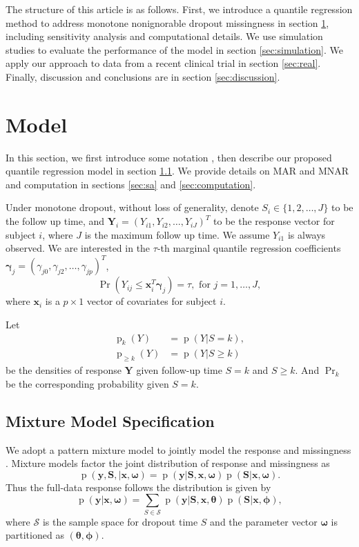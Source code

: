\documentclass[12pt]{article}
\DeclareMathOperator{\pr}{p}
\DeclareMathOperator{\prob}{Pr}
\begin{document}
The structure of this article is as follows. First, we introduce a
quantile regression method to address monotone nonignorable dropout
missingness in section \ref{sec:model}, including sensitivity analysis
and computational details.  We use simulation studies to evaluate the
performance of the model in section \ref{sec:simulation}. We apply our
approach to data from a recent clinical trial in section
\ref{sec:real}. Finally, discussion and conclusions are in section
\ref{sec:discussion}.

\section{Model}
\label{sec:model}

In this section, we first introduce some notation
, then describe our proposed quantile regression model in
section \ref{sec:settings}. We provide details on MAR and MNAR
and computation in sections \ref{sec:sa} and \ref{sec:computation}.

Under monotone dropout, without loss of generality, denote $S_i \in
\{1, 2, \ldots, J\}$ to be the follow up time, and $\bm Y_i = (Y_{i1},
Y_{i2}, \ldots, Y_{iJ})^{T}$ to be the response vector for subject
$i$, where $J$ is the maximum follow up time. We assume $Y_{i1}$ is
always observed. We are interested in the $\tau$-th marginal quantile
regression coefficients $\bm \gamma_j = (\gamma_{j0}, \gamma_{j2},
\ldots, \gamma_{jp})^T$,
\begin{equation}
  \label{eq:quantile}
  \prob (Y_{ij} \leq \bm x_i^{T} \bm \gamma_j ) = \tau, \text{ for } j = 1, \ldots, J,
\end{equation}
where $\bm x_i$ is a $p \times 1$ vector of covariates for subject $i$.

Let
\begin{align*}
  \pr_k(Y) &= \pr (Y | S = k), \\
  \pr_{\geq k} (Y) & = \pr (Y | S \geq k)
\end{align*}
be the densities of response $\bm Y$ given follow-up time $S=k$ and $S
\geq k$. And $\prob_k$ be the corresponding probability given $S = k$.

\subsection{Mixture Model Specification}
\label{sec:settings}
We adopt a pattern mixture model to jointly model the response and
missingness \citep{little1994, dh2008}. Mixture models factor the
joint distribution of response and missingness as
\begin{displaymath}
  \pr (\bm y, \bm S, |\bm x, \bm \omega) = \pr (\bm y|\bm S, \bm x, \bm \omega) \pr (\bm S | \bm x, \bm \omega).
\end{displaymath}
Thus the full-data response follows the distribution is given by
\begin{displaymath}
  \pr (\bm y | \bm x, \bm \omega) = \sum_{S \in \mathcal{S}} \pr(\bm y| \bm S, \bm x, \bm \theta) \pr (\bm S | \bm x, \bm \phi),
\end{displaymath}
where $\mathcal{S}$ is the sample space for dropout time $S$ and the
parameter vector $\bm \omega$ is partitioned as $(\bm \theta, \bm
\phi)$.
\end{document}
